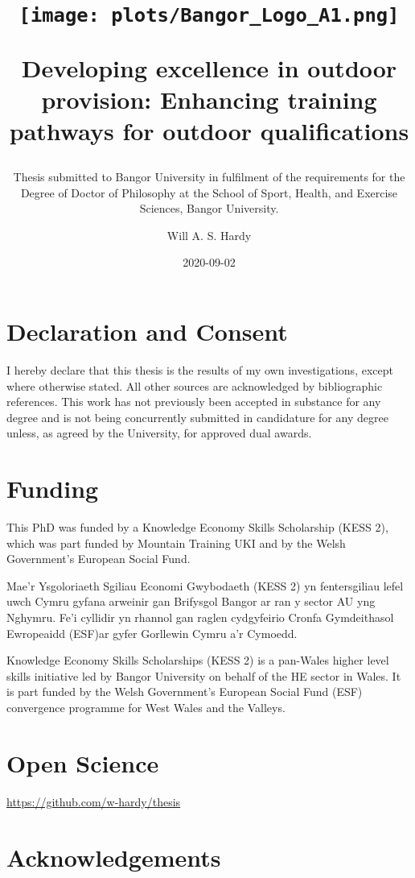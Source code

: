 \documentclass[
  12pt,
  a4paper,
]{book}
\title{\texttt{[image: plots/Bangor\_Logo\_A1.png]}

\textbf{Developing excellence in outdoor provision: Enhancing training pathways for outdoor qualifications}}
\subtitle{\hfill \break  Thesis submitted to Bangor University in fulfilment of the requirements for the Degree of Doctor of Philosophy at the School of Sport, Health, and Exercise Sciences, Bangor University.}
\author{Will A. S. Hardy}
\date{2020-09-02}
\begin{document}
\maketitle

\frontmatter

\section*{Declaration and Consent}

I hereby declare that this thesis is the results of my own investigations, except where otherwise stated. All other sources are acknowledged by bibliographic references. This work has not previously been accepted in substance for any degree and is not being concurrently submitted in candidature for any degree unless, as agreed by the University, for approved dual awards.

\section*{Funding}

This PhD was funded by a Knowledge Economy Skills Scholarship (KESS 2), which was part funded by Mountain Training UKI and by the Welsh Government's European Social Fund.

Mae’r Ysgoloriaeth Sgiliau Economi Gwybodaeth (KESS 2) yn fentersgiliau lefel uwch Cymru gyfana arweinir gan Brifysgol Bangor ar ran y sector AU yng Nghymru. Fe’i cyllidir yn rhannol gan raglen cydgyfeirio Cronfa Gymdeithasol Ewropeaidd (ESF)ar gyfer Gorllewin Cymru a’r Cymoedd.

Knowledge Economy Skills Scholarships (KESS 2) is a pan-Wales higher level skills initiative led by Bangor University on behalf of the HE sector in Wales. It is part funded by the Welsh Government’s European Social Fund (ESF) convergence programme for West Wales and the Valleys.

\section*{Open Science}

\url{https://github.com/w-hardy/thesis}

\section*{Acknowledgements}
\end{document}
